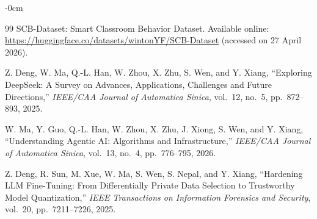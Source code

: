 \documentclass[symmetry,article,submit,pdftex,moreauthors]{Definitions/mdpi}
\begin{document}
\begin{adjustwidth}{-\extralength}{0cm}
\begin{thebibliography}{99}
SCB-Dataset: Smart Classroom Behavior Dataset.
Available online: \url{https://huggingface.co/datasets/wintonYF/SCB-Dataset} (accessed on 27 April 2026).

Z. Deng, W. Ma, Q.-L. Han, W. Zhou, X. Zhu, S. Wen, and Y. Xiang,
``Exploring DeepSeek: A Survey on Advances, Applications, Challenges and Future Directions,''
\emph{IEEE/CAA Journal of Automatica Sinica}, vol.~12, no.~5, pp.~872--893, 2025.

W. Ma, Y. Guo, Q.-L. Han, W. Zhou, X. Zhu, J. Xiong, S. Wen, and Y. Xiang,
``Understanding Agentic AI: Algorithms and Infrastructure,''
\emph{IEEE/CAA Journal of Automatica Sinica}, vol.~13, no.~4, pp.~776--795, 2026.

Z. Deng, R. Sun, M. Xue, W. Ma, S. Wen, S. Nepal, and Y. Xiang,
``Hardening LLM Fine-Tuning: From Differentially Private Data Selection to Trustworthy Model Quantization,''
\emph{IEEE Transactions on Information Forensics and Security}, vol.~20, pp.~7211--7226, 2025.

\end{thebibliography}

\end{adjustwidth}
\end{document}
